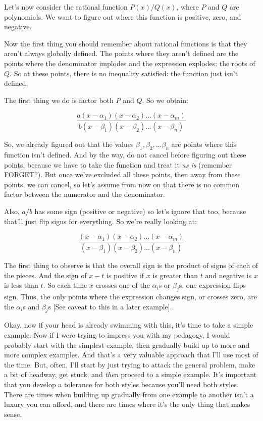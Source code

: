 \documentclass{amsart}
\begin{document}
Let's now consider the rational function $P(x)/Q(x)$, where $P$ and
$Q$ are polynomials. We want to figure out where this function is
positive, zero, and negative.

Now the first thing you should remember about rational functions is
that they aren't always globally defined. The points where they aren't
defined are the points where the denominator implodes and the
expression explodes: the roots of $Q$. So at these points, there is no
inequality satisfied: the function just isn't defined.

The first thing we do is factor both $P$ and $Q$. So we obtain:

\begin{equation*}
  \frac{a(x - \alpha_1)(x - \alpha_2) \dots (x - \alpha_m)}{b(x - \beta_1)(x - \beta_2) \dots (x - \beta_n)}
\end{equation*}

So, we already figured out that the values $\beta_1, \beta_2, \dots
\beta_n$ are points where this function isn't defined. And by the way,
do not cancel before figuring out these points, because we have to
take the function and treat it {\em as is} (remember FORGET?). But
once we've excluded all these points, then away from these points, we
can cancel, so let's assume from now on that there is no common factor
between the numerator and the denominator.

Also, $a/b$ has some sign (positive or negative) so let's ignore that
too, because that'll just flip signs for everything. So we're really
looking at:

\begin{equation*}
  \frac{(x - \alpha_1)(x - \alpha_2) \dots (x - \alpha_m)}{(x - \beta_1)(x - \beta_2) \dots (x - \beta_n)}
\end{equation*}

The first thing to observe is that the overall sign is the
product of signs of each of the pieces. And the sign of $x - t$ is
positive if $x$ is greater than $t$ and negative is $x$ is less than
$t$. So each time $x$ crosses one of the $\alpha_i$s or $\beta_j$s,
one expression flips sign. Thus, the only points where the expression
changes sign, or crosses zero, are the $\alpha_i$s and $\beta_j$s [See
caveat to this in a later example].

Okay, now if your head is already swimming with this, it's time to
take a simple example. Now if I were trying to impress you with my
pedagogy, I would probably start with the simplest example, then
gradually build up to more and more complex examples. And that's a
very valuable approach that I'll use most of the time. But, often,
I'll start by just trying to attack the general problem, make a bit of
headway, get stuck, and {\em then} proceed to a simple example. It's
important that you develop a tolerance for both styles because you'll
need both styles. There are times when building up gradually from one
example to another isn't a luxury you can afford, and there are times
where it's the only thing that makes sense.
\end{document}
